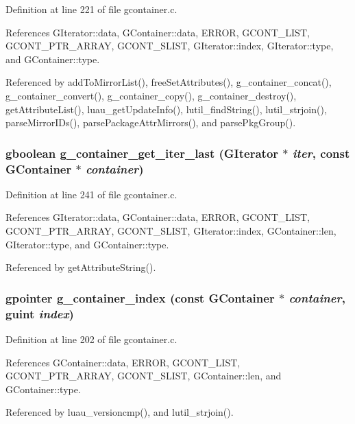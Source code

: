 Definition at line 221 of file gcontainer.c.

References GIterator::data, GContainer::data, ERROR, GCONT\_\-LIST, GCONT\_\-PTR\_\-ARRAY, GCONT\_\-SLIST, GIterator::index, GIterator::type, and GContainer::type.

Referenced by add\-To\-Mirror\-List(), free\-Set\-Attributes(), g\_\-container\_\-concat(), g\_\-container\_\-convert(), g\_\-container\_\-copy(), g\_\-container\_\-destroy(), get\-Attribute\-List(), luau\_\-get\-Update\-Info(), lutil\_\-find\-String(), lutil\_\-strjoin(), parse\-Mirror\-IDs(), parse\-Package\-Attr\-Mirrors(), and parse\-Pkg\-Group().
\subsubsection{\setlength{\rightskip}{0pt plus 5cm}gboolean g\_\-container\_\-get\_\-iter\_\-last ({\bf GIterator} $\ast$ {\em iter}, const {\bf GContainer} $\ast$ {\em container})}\label{gcontainer_8c_a13}




Definition at line 241 of file gcontainer.c.

References GIterator::data, GContainer::data, ERROR, GCONT\_\-LIST, GCONT\_\-PTR\_\-ARRAY, GCONT\_\-SLIST, GIterator::index, GContainer::len, GIterator::type, and GContainer::type.

Referenced by get\-Attribute\-String().
\subsubsection{\setlength{\rightskip}{0pt plus 5cm}gpointer g\_\-container\_\-index (const {\bf GContainer} $\ast$ {\em container}, guint {\em index})}\label{gcontainer_8c_a11}




Definition at line 202 of file gcontainer.c.

References GContainer::data, ERROR, GCONT\_\-LIST, GCONT\_\-PTR\_\-ARRAY, GCONT\_\-SLIST, GContainer::len, and GContainer::type.

Referenced by luau\_\-versioncmp(), and lutil\_\-strjoin().
